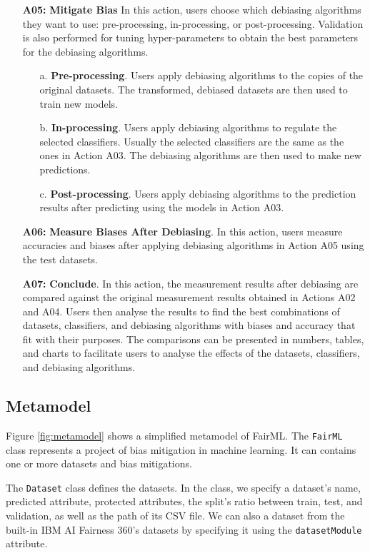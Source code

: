 \documentclass[sigconf,review]{acmart}
\begin{document}
\begin{itemize}
\item[\textbf{A05:}] \textbf{Mitigate Bias}
In this action, users choose which debiasing algorithms they want to use: pre-processing, in-processing, or post-processing. Validation is also performed for tuning hyper-parameters to obtain the best parameters for the debiasing algorithms.
\begin{itemize}
	\item[a.] \textbf{Pre-processing}. Users apply debiasing algorithms to the copies of the original datasets. The transformed, debiased datasets are then used to train new models.
	\item[b.] \textbf{In-processing}. Users apply debiasing algorithms to regulate the selected classifiers. Usually the selected classifiers are the same as the ones in Action A03. The debiasing algorithms are then used to make new predictions.
	\item[c.] \textbf{Post-processing}. Users apply debiasing algorithms to the prediction results after predicting using the models in Action A03. 
\end{itemize}

\item[\textbf{A06:}] \textbf{Measure Biases After Debiasing}. In this action, users measure accuracies and biases after applying debiasing algorithms in Action A05 using the test datasets. 

\item[\textbf{A07:}] \textbf{Conclude}. In this action, the measurement results after debiasing are compared against the original measurement results obtained in Actions A02 and A04. Users then analyse the results to find the best combinations of datasets, classifiers, and debiasing algorithms with biases and accuracy that fit with their purposes. The comparisons can be presented in numbers, tables, and charts to facilitate users to analyse the effects of the datasets, classifiers, and debiasing algorithms. 
\end{itemize}

\subsection{Metamodel}
\label{sec:metamodel}
Figure \ref{fig:metamodel} shows a simplified metamodel of FairML. The \texttt{FairML} class represents a project of bias mitigation in machine learning. It can contains one or more datasets and bias mitigations. 

The \texttt{Dataset} class defines the datasets. In the class, we specify a dataset's name, predicted attribute, protected attributes, the split's ratio between train, test, and validation, as well as the path of its CSV file. We can also a dataset from the built-in IBM AI Fairness 360's datasets by specifying it using the \texttt{datasetModule} attribute.
\end{document}
